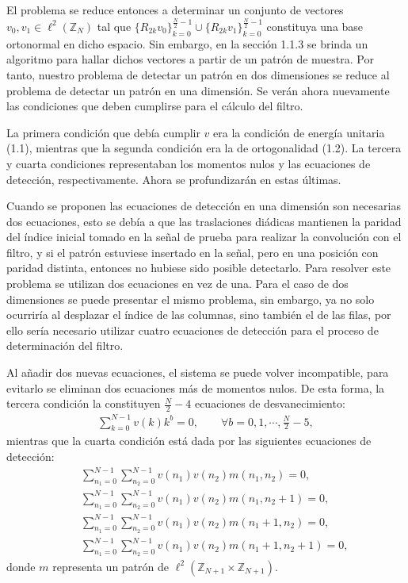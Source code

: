 \par El problema se reduce entonces a determinar un conjunto de vectores\linebreak $v_0,v_1\in \ell^2(\mathbb{Z}_N)$ tal que $\{R_{2k}v_0\}_{k=0}^{\frac{N}{2}-1}\cup\{R_{2k}v_1\}_{k=0}^{\frac{N}{2}-1}$ constituya una base ortonormal en dicho espacio. Sin embargo, en la secci\'on 1.1.3 se brinda un algoritmo para hallar dichos vectores a partir de un patr\'on de muestra. Por tanto, nuestro problema de detectar un patr\'on en dos dimensiones se reduce al problema de detectar un patr\'on en una dimensi\'on. Se ver\'an ahora nuevamente las condiciones que deben cumplirse para el c\'alculo del filtro.\\

\par La primera condici\'on que deb\'ia cumplir $v$ era la condici\'on de energ\'ia unitaria (1.1), mientras que la segunda condici\'on era la de ortogonalidad (1.2). La tercera y cuarta condiciones representaban los momentos nulos y las ecuaciones de detecci\'on, respectivamente. Ahora se profundizar\'an en estas \'ultimas.

\par Cuando se proponen las ecuaciones de detecci\'on en una dimensi\'on son necesarias dos ecuaciones, esto se deb\'ia a que las traslaciones di\'adicas mantienen la paridad del \'indice inicial tomado en la se\~nal de prueba para realizar la convoluci\'on con el filtro, y si el patr\'on estuviese insertado en la se\~nal, pero en una posici\'on con paridad distinta, entonces no hubiese sido posible detectarlo. Para resolver este problema se utilizan dos ecuaciones en vez de una. Para el caso de dos dimensiones se puede presentar el mismo problema, sin embargo, ya no solo ocurrir\'ia al desplazar el \'indice de las columnas, sino tambi\'en el de las filas, por ello ser\'ia necesario utilizar cuatro ecuaciones de detecci\'on para el proceso de determinaci\'on del filtro.
\par Al a\~nadir dos nuevas ecuaciones, el sistema se puede volver incompatible, para evitarlo se eliminan dos ecuaciones m\'as de momentos nulos. De esta forma, la tercera condici\'on la constituyen $\frac{N}{2}-4$ ecuaciones de desvanecimiento:
\begin{eqnarray}
\sum_{k=0}^{N-1}v(k)k^b=0,\qquad\forall b=0,1,\cdots,\frac{N}{2}-5,\nonumber
\end{eqnarray}
mientras que la cuarta condici\'on est\'a dada por las siguientes ecuaciones de detecci\'on:
\begin{eqnarray}
&&\sum_{n_1=0}^{N-1}\sum_{n_2=0}^{N-1}v(n_1)v(n_2)m(n_1,n_2)=0,\nonumber\\
&&\sum_{n_1=0}^{N-1}\sum_{n_2=0}^{N-1}v(n_1)v(n_2)m(n_1,n_2+1)=0,\nonumber\\
&&\sum_{n_1=0}^{N-1}\sum_{n_2=0}^{N-1}v(n_1)v(n_2)m(n_1+1,n_2)=0,\nonumber\\
&&\sum_{n_1=0}^{N-1}\sum_{n_2=0}^{N-1}v(n_1)v(n_2)m(n_1+1,n_2+1)=0,\nonumber
\end{eqnarray}
donde $m$ representa un patr\'on de $\ell^2(\mathbb{Z}_{N+1}\times\mathbb{Z}_{N+1})$.\\

